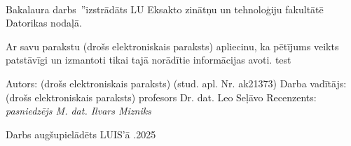 \documentclass[12pt]{report}%
\theoremstyle{definition}
\def\degree{Bakalaura darbs}
\newcommand{\thedate}[0]{26.05.2025}%
\begin{document}
\cleardoublepage
{}
{}
\printbibliography

%
%


\newpage
\thispagestyle{empty}
\makeatletter
{
\setlength{\parindent}{1cm}
\linespread{1.5}
\selectfont
~\\
\newline

\degree \ \quotedblbase\textit{\@title}\textquotedblright \space izstrādāts LU Eksakto zinātņu un tehnoloģiju fakultātē
Datorikas nodaļā.
\newline

Ar savu parakstu (drošs elektroniskais paraksts) apliecinu, ka pētījums veikts
patstāvīgi un izmantoti tikai tajā norādītie informācijas avoti. test
\newline

Autors: (drošs elektroniskais paraksts) \@author \space (stud. apl. Nr. ak21373)
\newline
\newline
\newline
\newline
Darba vadītājs: (drošs elektroniskais paraksts) profesors Dr. dat. Leo Seļāvo
\newline
\newline
Recenzents: \textit{pasniedzējs M. dat. Ilvars Mizniks}
\newline
\newline

Darbs augšupielādēts LUIS’ā \qquad \thedate

}
\makeatother
\end{document}
